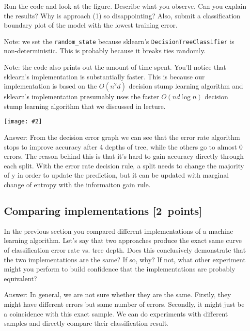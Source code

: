 \documentclass{article}
\newcommand{\blu}[1]{{\textcolor{blu}{#1}}}
\newenvironment{answer}{\par\begingroup\color{gre}Answer: }{\endgroup}
\let\ask\blu
\newcommand\pts[1]{\textcolor{pointscolour}{[#1~points]}}
\newcommand{\centerfig}[2]{\begin{center}\texttt{[image: \#2]}\end{center}}
\begin{document}
  Run the code and look at the figure.
  \ask{Describe what you observe. Can you explain the results?} Why is approach (1) so disappointing? Also, \ask{submit a classification boundary plot of the model with the lowest training error}.

  Note: we set the \verb|random_state| because sklearn's \texttt{DecisionTreeClassifier} is non-deterministic. This is probably
  because it breaks ties randomly.

  Note: the code also prints out the amount of time spent. You'll notice that sklearn's implementation is substantially faster. This is because
  our implementation is based on the $O(n^2d)$ decision stump learning algorithm and sklearn's implementation presumably uses the faster $O(nd\log n)$
  decision stump learning algorithm that we discussed in lecture.
  \centerfig{0.7}{./figs/q6_5_decisionBoundary}
  \begin{answer}
    From the decision error graph we can see that the error rate algorithm stops to improve accuracy after 4 depths of tree, while the others go to almost 0 errors. The reason behind this is that it's hard to gain accuracy directly through each split. With the error rate decision rule, a split needs to change the majority of y in order to update the prediction, but it can be updated with marginal change of entropy with the informaiton gain rule.
  \end{answer}

  \subsection{Comparing implementations \pts{2}}

  In the previous section you compared different implementations of a machine learning algorithm. Let's say that two
  approaches produce the exact same curve of classification error rate vs. tree depth. Does this conclusively demonstrate
  that the two implementations are the same? If so, why? If not, what other experiment might you perform to build confidence
  that the implementations are probably equivalent?

  \begin{answer}
    In general, we are not sure whether they are the same. Firstly, they might have different errors but same number of errors. Secondly, it might just be a coincidence with this exact sample. We can do experiments with different samples and directly compare their classification result.
  \end{answer}
\end{document}
